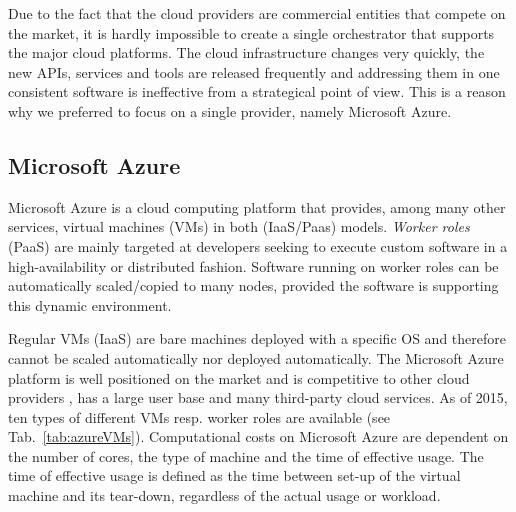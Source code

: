 \documentclass[3p,times]{elsarticle}
\begin{document}
Due to the fact that the cloud providers are commercial entities that compete on the market, it is hardly impossible to create a single orchestrator that supports the major cloud platforms. The cloud infrastructure changes very quickly, the new APIs, services and tools are released frequently and addressing them in one consistent software is ineffective from a strategical point of view. This is a reason why we preferred to focus on a single provider, namely Microsoft Azure.






\subsection{Microsoft Azure}

Microsoft Azure is a cloud computing platform that provides, among many other services, virtual machines (VMs) in both (IaaS/Paas) models. \textit{Worker roles} (PaaS) are mainly targeted at developers seeking to execute custom software in a high-availability or distributed fashion.
Software running on worker roles can be automatically scaled/copied to many nodes, provided the software is supporting this dynamic environment. 

Regular VMs (IaaS) are bare machines deployed with a specific OS and therefore cannot be scaled automatically nor deployed automatically.
The Microsoft Azure platform is well positioned on the market and is competitive to other cloud providers \cite{cloudScores} \cite{twister4azure}, has a large user base and many third-party cloud services. As of 2015, ten types of different VMs resp. worker roles are available (see Tab.~\ref{tab:azureVMs}). Computational costs on Microsoft Azure are dependent on the number of cores, the type of machine and the time of effective usage. The time of effective usage is defined as the time between set-up of the virtual machine and its tear-down, regardless of the actual usage or workload. \\
\end{document}
